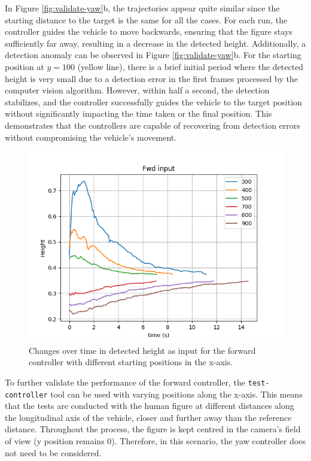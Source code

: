 In Figure \ref{fig:validate-yaw}b, the trajectories appear quite similar since the starting distance to the target is the same for all the cases. For each run, the controller guides the vehicle to move backwards, ensuring that the figure stays sufficiently far away, resulting in a decrease in the detected height. Additionally, a detection anomaly can be observed in Figure \ref{fig:validate-yaw}b. For the starting position at $y=100$ (yellow line), there is a brief initial period where the detected height is very small due to a detection error in the first frames processed by the computer vision algorithm. However, within half a second, the detection stabilizes, and the controller successfully guides the vehicle to the target position without significantly impacting the time taken or the final position. This demonstrates that the controllers are capable of recovering from detection errors without compromising the vehicle's movement.


\begin{figure}[H]
  \centering
  \includegraphics[width=.7\textwidth, keepaspectratio]{img/pid/validation_fwd.png}
  \caption{Changes over time in detected height as input for the forward controller with different starting positions in the x-axis.}
  \label{fig:validate-fwd}
\end{figure}


To further validate the performance of the forward controller, the \texttt{test-controller} tool can be used with varying positions along the x-axis. This means that the tests are conducted with the human figure at different distances along the longitudinal axis of the vehicle, closer and further away than the reference distance. Throughout the process, the figure is kept centred in the camera's field of view (y position remains 0). Therefore, in this scenario, the yaw controller does not need to be considered.

